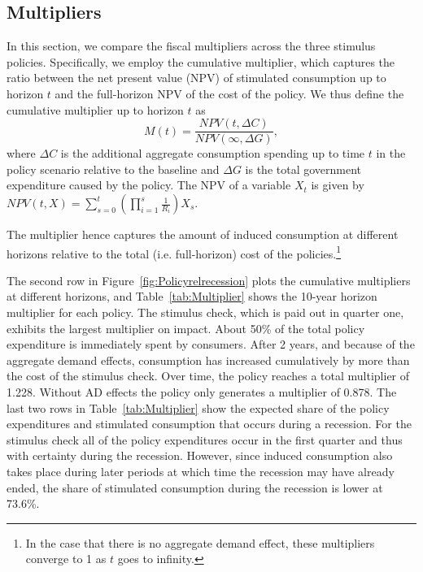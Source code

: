 \documentclass[qe,draft]{econsocart}
\theoremstyle{plain}
\theoremstyle{definition}
\begin{document}
\subsection{Multipliers}
\label{sec:multipliers} %

In this section, we compare the fiscal multipliers across the three stimulus policies.
Specifically, we employ the cumulative multiplier, which captures the ratio between the net present value (NPV) of stimulated consumption up to horizon $t$ and the full-horizon NPV of the cost of the policy.
We thus define the cumulative multiplier up to horizon $t$ as
\begin{equation}
  \label{eqn:cumMultiplier} %
  M(t) = \frac{NPV(t,\Delta C)}{NPV (\infty,\Delta G)},
\end{equation}
where $\Delta C$ is the additional aggregate consumption spending up to time $t$ in the policy scenario relative to the baseline and $\Delta G$ is the total government expenditure caused by the policy.
The NPV of a variable $X_t$ is given by
$NPV(t,X) = \sum_{s=0}^{t} \left( \prod_{i=1}^{s} \frac{1}{R_i} \right) X_s$.

The multiplier hence captures the amount of induced consumption at different horizons relative to the total (i.e.
full-horizon) cost of the policies.\footnote{In the case that there is no aggregate demand effect, these multipliers converge to 1 as $t$ goes to infinity.}

The second row in Figure~\ref{fig:Policyrelrecession} plots the cumulative multipliers at different horizons, and Table~\ref{tab:Multiplier} shows the 10-year horizon multiplier for each policy.
The stimulus check, which is paid out in quarter one, exhibits the largest multiplier on impact.
About 50\% of the total policy expenditure is immediately spent by consumers.
After 2 years, and because of the aggregate demand effects, consumption has increased cumulatively by more than the cost of the stimulus check.
Over time, the policy reaches a total multiplier of 1.228.
Without AD effects the policy only generates a multiplier of 0.878.
The last two rows in Table~\ref{tab:Multiplier} show the expected share of the policy expenditures and stimulated consumption that occurs during a recession.
For the stimulus check all of the policy expenditures occur in the first quarter and thus with certainty during the recession.
However, since induced consumption also takes place during later periods at which time the recession may have already ended, the share of stimulated consumption during the recession is lower at 73.6\%.
\end{document}
